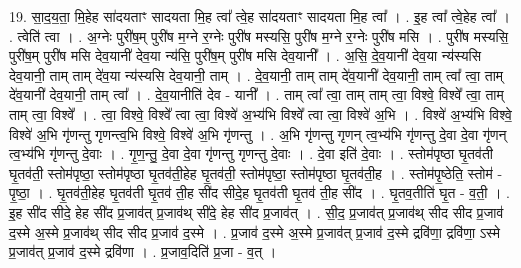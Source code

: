 \documentclass[17pt]{extarticle}
\begin{document}
19. सा॒द॒य॒ता॒ मि॒हेह सा॑दयताꣳ सादयता मि॒ह त्वा᳚ त्वे॒ह सा॑दयताꣳ सादयता मि॒ह त्वा᳚ । . इ॒ह त्वा᳚ त्वे॒हेह त्वा᳚ । . त्वेति॑ त्वा । . अ॒ग्नेः पुरी॑ष॒म् पुरी॑ष म॒ग्ने र॒ग्नेः पुरी॑ष मस्यसि॒ पुरी॑ष म॒ग्ने र॒ग्नेः पुरी॑ष मसि । . पुरी॑ष मस्यसि॒ पुरी॑ष॒म् पुरी॑ष मसि देव॒यानी॑ देव॒या न्य॑सि॒ पुरी॑ष॒म् पुरी॑ष मसि देव॒यानी᳚ । . अ॒सि॒ दे॒व॒यानी॑ देव॒या न्य॑स्यसि देव॒यानी॒ ताम् ताम् दे॑व॒या न्य॑स्यसि देव॒यानी॒ ताम् । . दे॒व॒यानी॒ ताम् ताम् दे॑व॒यानी॑ देव॒यानी॒ ताम् त्वा᳚ त्वा॒ ताम् दे॑व॒यानी॑ देव॒यानी॒ ताम् त्वा᳚ । . दे॒व॒यानीति॑ देव - यानी᳚ । . ताम् त्वा᳚ त्वा॒ ताम् ताम् त्वा॒ विश्वे॒ विश्वे᳚ त्वा॒ ताम् ताम् त्वा॒ विश्वे᳚ । . त्वा॒ विश्वे॒ विश्वे᳚ त्वा त्वा॒ विश्वे॑ अ॒भ्य॑भि विश्वे᳚ त्वा त्वा॒ विश्वे॑ अ॒भि । . विश्वे॑ अ॒भ्य॑भि विश्वे॒ विश्वे॑ अ॒भि गृ॑णन्तु गृणन्त्व॒भि विश्वे॒ विश्वे॑ अ॒भि गृ॑णन्तु । . अ॒भि गृ॑णन्तु गृणन् त्व॒भ्य॑भि गृ॑णन्तु दे॒वा दे॒वा गृ॑णन् त्व॒भ्य॑भि गृ॑णन्तु दे॒वाः । . गृ॒ण॒न्तु॒ दे॒वा दे॒वा गृ॑णन्तु गृणन्तु दे॒वाः । . दे॒वा इति॑ दे॒वाः । . स्तोम॑पृष्ठा घृ॒तव॑ती घृ॒तव॑ती॒ स्तोम॑पृष्ठा॒ स्तोम॑पृष्ठा घृ॒तव॑ती॒हेह घृ॒तव॑ती॒ स्तोम॑पृष्ठा॒ स्तोम॑पृष्ठा घृ॒तव॑ती॒ह । . स्तोम॑पृ॒ष्ठेति॒ स्तोम॑ - पृ॒ष्ठा॒ । . घृ॒तव॑ती॒हेह घृ॒तव॑ती घृ॒तव॑ ती॒ह सी॑द सीदे॒ह घृ॒तव॑ती घृ॒तव॑ ती॒ह सी॑द । . घृ॒तव॒तीति॑ घृ॒त - व॒ती॒ । . इ॒ह सी॑द सीदे॒ हेह सी॑द प्र॒जाव॑त् प्र॒जाव॑थ् सी॑दे॒ हेह सी॑द प्र॒जाव॑त् । . सी॒द॒ प्र॒जाव॑त् प्र॒जाव॑थ् सीद सीद प्र॒जाव॑ द॒स्मे अ॒स्मे प्र॒जाव॑थ् सीद सीद प्र॒जाव॑ द॒स्मे । . प्र॒जाव॑ द॒स्मे अ॒स्मे प्र॒जाव॑त् प्र॒जाव॑ द॒स्मे द्रवि॑णा॒ द्रवि॑णा॒ ऽस्मे प्र॒जाव॑त् प्र॒जाव॑ द॒स्मे द्रवि॑णा । . प्र॒जाव॒दिति॑ प्र॒जा - व॒त् । \newline
\end{document}
